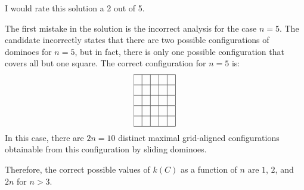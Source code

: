 I would rate this solution a 2 out of 5.

The first mistake in the solution is the incorrect analysis for the case $n=5$. The candidate incorrectly states that there are two possible configurations of dominoes for $n=5$, but in fact, there is only one possible configuration that covers all but one square. The correct configuration for $n=5$ is:
\[
\begin{array}{|c|c|c|c|c|}
\hline
& & & & \\
\hline
& & & & \\
\hline
& & & & \\
\hline
& & & & \\
\hline
& & & & \\
\hline
\end{array}
\]
In this case, there are $2n=10$ distinct maximal grid-aligned configurations obtainable from this configuration by sliding dominoes.

Therefore, the correct possible values of $k(C)$ as a function of $n$ are $1$, $2$, and $2n$ for $n>3$.
